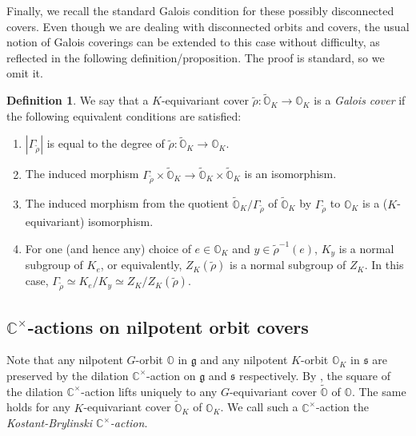 \documentclass[11pt, a4paper]{amsart}
\newcommand{\C}{\mathbb{C}}
\newcommand{\g}{\mathfrak{g}}
\newcommand{\orb}{\mathbb{O}}
\newcommand{\orbk}{\orb_{K}}
\newcommand{\torbk}{\widetilde{\orb}_{K}}
\newcommand{\fs}{\mathfrak{s}}
\newcommand{\cm}{\C^\times}
\theoremstyle{definition}
\newtheorem{defi}[Thm]{Definition}
\numberwithin{equation}{section}
\begin{document}
Finally, we recall the standard Galois condition for these possibly disconnected covers. Even though we are dealing with disconnected orbits and covers, the usual notion of Galois coverings can be extended to this case without difficulty, as reflected in the following definition/proposition. The proof is standard, so we omit it. 

\begin{defi} \label{defn:Galois} 
We say that a $K$-equivariant cover $\tilde{\rho}: \torbk \to \orbk$ is a {\it Galois cover} if the following equivalent conditions are satisfied:
\begin{enumerate}[label=(\roman*), itemindent=*, leftmargin=*]
    \item $|\Gamma_{\tilde{\rho}}|$ is equal to the degree of $\tilde{\rho}: \torbk \to \orbk$.
	\item The induced morphism $\Gamma_{\tilde{\rho}} \times \torbk \to \torbk \times \torbk$ is an isomorphism.
	\item The induced morphism from the quotient $\torbk/\Gamma_{\tilde{\rho}}$ of $\torbk$ by $\Gamma_{\tilde{\rho}}$ to $\orbk$ is a ($K$-equivariant) isomorphism.
    \item For one (and hence any) choice of $e \in \orbk$ and $y \in \tilde{\rho}^{-1}(e)$, $K_y$ is a normal subgroup of $K_e$, or equivalently, $Z_K(\tilde{\rho})$ is a normal subgroup of $Z_K$. In this case, $\Gamma_{\tilde{\rho}} \simeq K_e/K_y \simeq Z_K / Z_K(\tilde{\rho})$.
\end{enumerate}
\end{defi}


\subsection{\texorpdfstring{$\cm$}{C\textasciicircum{}*}-actions on nilpotent orbit covers} \label{subsec:orbit_cm}
Note that any nilpotent $G$-orbit $\orb$ in $\g$ and any nilpotent $K$-orbit $\orbk$ in $\fs$ are preserved by the dilation $\cm$-action on $\g$ and $\fs$ respectively. By \cite[Lemma 1.3]{Brylinski-Kostant}, the square of the dilation $\cm$-action lifts uniquely to any $G$-equivariant cover $\widetilde{\orb}$ of $\orb$. The same holds for any $K$-equivariant cover $\torbk$ of $\orbk$. We call such a $\cm$-action the \emph{Kostant-Brylinski $\cm$-action}. 
\end{document}
